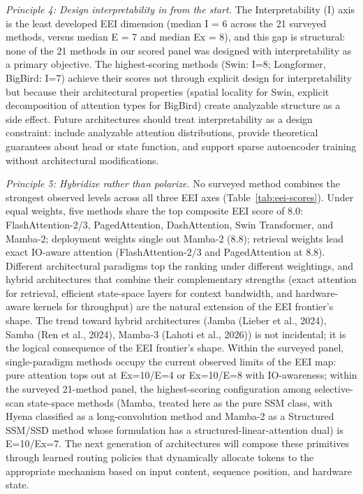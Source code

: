 \documentclass[10pt,twocolumn]{article}
\begin{document}
\textit{Principle 4: Design interpretability in from the start.} The Interpretability (I) axis is the least developed EEI dimension (median I = 6 across the 21 surveyed methods, versus median E = 7 and median Ex = 8), and this gap is structural: none of the 21 methods in our scored panel was designed with interpretability as a primary objective. The highest-scoring methods (Swin: I=8; Longformer, BigBird: I=7) achieve their scores not through explicit design for interpretability but because their architectural properties (spatial locality for Swin, explicit decomposition of attention types for BigBird) create analyzable structure as a side effect. Future architectures should treat interpretability as a design constraint: include analyzable attention distributions, provide theoretical guarantees about head or state function, and support sparse autoencoder training without architectural modifications.

\textit{Principle 5: Hybridize rather than polarize.} No surveyed method combines the strongest observed levels across all three EEI axes (Table~\ref{tab:eei-scores}). Under equal weights, five methods share the top composite EEI score of 8.0: FlashAttention-2/3, PagedAttention, DashAttention, Swin Transformer, and Mamba-2; deployment weights single out Mamba-2 (8.8); retrieval weights lead exact IO-aware attention (FlashAttention-2/3 and PagedAttention at 8.8). Different architectural paradigms top the ranking under different weightings, and hybrid architectures that combine their complementary strengths (exact attention for retrieval, efficient state-space layers for context bandwidth, and hardware-aware kernels for throughput) are the natural extension of the EEI frontier's shape. The trend toward hybrid architectures (Jamba (Lieber et al., 2024), Samba (Ren et al., 2024), Mamba-3 (Lahoti et al., 2026)) is not incidental; it is the logical consequence of the EEI frontier's shape. Within the surveyed panel, single-paradigm methods occupy the current observed limits of the EEI map: pure attention tops out at Ex=10/E=4 or Ex=10/E=8 with IO-awareness; within the surveyed 21-method panel, the highest-scoring configuration among selective-scan state-space methods (Mamba, treated here as the pure SSM class, with Hyena classified as a long-convolution method and Mamba-2 as a Structured SSM/SSD method whose formulation has a structured-linear-attention dual) is E=10/Ex=7. The next generation of architectures will compose these primitives through learned routing policies that dynamically allocate tokens to the appropriate mechanism based on input content, sequence position, and hardware state.
\end{document}
